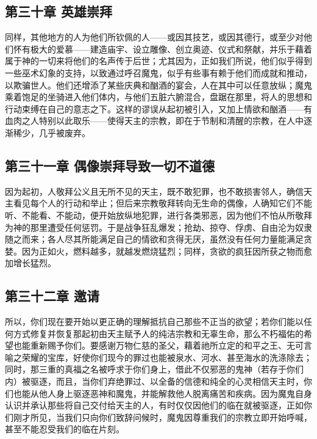 
\subsection{第三十章 英雄崇拜}

同样，其他地方的人为他们所钦佩的人——或因其技艺，或因其德行，或至少对他们怀有极大的爱慕——建造庙宇、设立雕像、创立奥迹、仪式和祭献，并乐于藉着属于神的一切来将他们的名声传于后世；尤其因为，正如我们所说，他们似乎得到一些巫术幻象的支持，以致通过呼召魔鬼，似乎有些事有赖于他们而成就和推动，以欺骗世人。他们还增添了某些庆典和酗酒的宴会，人在其中可以任意放纵；魔鬼乘着饱足的坐骑进入他们体内，与他们五脏六腑混合，盘踞在那里，将人的思想和行动束缚在自己的意志之下。这样的谬误从起初被引入，又加上情欲和酗酒——有血肉之人特别以此取乐——使得天主的宗教，即在于节制和清醒的宗教，在人中逐渐稀少，几乎被废弃。\par


\subsection{第三十一章 偶像崇拜导致一切不道德}

因为起初，人敬拜公义且无所不见的天主，既不敢犯罪，也不敢损害邻人，确信天主看见每个人的行动和举止；但后来宗教敬拜转向无生命的偶像，人确知它们不能听、不能看、不能动，便开始放纵地犯罪，进行各类邪恶，因为他们不怕从所敬拜为神的那里遭受任何惩罚。于是战争狂乱爆发；抢劫、掠夺、俘虏、自由沦为奴隶随之而来；各人尽其所能满足自己的情欲和贪得无厌，虽然没有任何力量能满足贪婪。因为正如火，燃料越多，就越发燃烧猛烈；同样，贪欲的疯狂因所获之物而愈加增长猛烈。\par


\subsection{第三十二章 邀请}

所以，你们现在要开始以更正确的理解抵抗自己那些不正当的欲望；若你们能以任何方式修复并恢复那起初由天主赋予人的纯洁宗教和无辜生命，那么不朽福佑的希望也能重新赐予你们。要感谢万物仁慈的圣父，藉着祂所立定的和平之王、无可言喻之荣耀的宝库，好使你们现今的罪过也能被泉水、河水、甚至海水的洗涤除去；同时，那三重的真福之名被呼求于你们身上，借此不仅邪恶的鬼神（若存于你们内）被驱逐，而且，当你们弃绝罪过、以全备的信德和纯全的心灵相信天主时，你们也能从他人身上驱逐恶神和魔鬼，并能解救他人脱离痛苦和疾病。因为魔鬼自身认识并承认那些将自己交付给天主的人，有时仅仅因他们的临在就被驱逐，正如你们刚才所见，当我们只向你们致辞问候时，魔鬼因尊重我们的宗教立即开始呼喊，甚至不能忍受我们的临在片刻。\par

